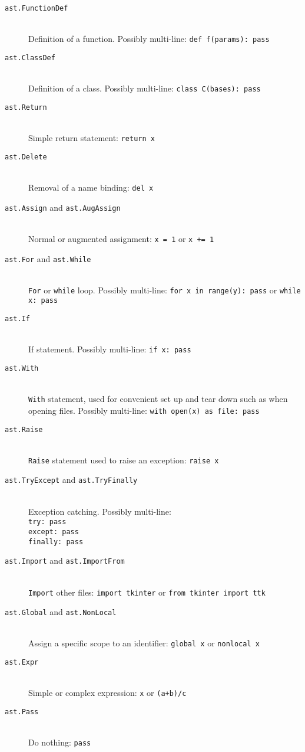 \documentclass[twoside,a4paper]{report}
\begin{document}
\begin{description}
\item[\texttt{ast.FunctionDef}] \hfill \\
Definition of a function. Possibly multi-line: \texttt{def f(params): pass}
\item[\texttt{ast.ClassDef}] \hfill \\
Definition of a class. Possibly multi-line: \texttt{class C(bases): pass}
\item[\texttt{ast.Return}] \hfill \\
Simple return statement: \texttt{return x}
\item[\texttt{ast.Delete}] \hfill \\
Removal of a name binding: \texttt{del x}
\item[\texttt{ast.Assign} and \texttt{ast.AugAssign}] \hfill \\
Normal or augmented assignment: \texttt{x = 1} or \texttt{x += 1}
\item[\texttt{ast.For} and \texttt{ast.While}] \hfill \\
\texttt{For} or \texttt{while} loop. Possibly multi-line: \texttt{for x in range(y): pass} or \texttt{while x: pass}
\item[\texttt{ast.If}] \hfill \\
If statement. Possibly multi-line: \texttt{if x: pass}
\item[\texttt{ast.With}] \hfill \\
\texttt{With} statement, used for convenient set up and tear down such as when opening files. Possibly multi-line: \texttt{with open(x) as file: pass}
\item[\texttt{ast.Raise}] \hfill \\
\texttt{Raise} statement used to raise an exception: \texttt{raise x}
\item[\texttt{ast.TryExcept} and \texttt{ast.TryFinally}] \hfill \\
Exception catching. Possibly multi-line: \\
\texttt{try: pass} \\
\texttt{except: pass} \\
\texttt{finally: pass}
\item[\texttt{ast.Import} and \texttt{ast.ImportFrom}] \hfill \\
\texttt{Import} other files: \texttt{import tkinter} or \texttt{from tkinter import ttk}
\item[\texttt{ast.Global} and \texttt{ast.NonLocal}] \hfill \\
Assign a specific scope to an identifier: \texttt{global x} or \texttt{nonlocal x}
\item[\texttt{ast.Expr}] \hfill \\
Simple or complex expression: \texttt{x} or \texttt{(a+b)/c}
\item[\texttt{ast.Pass}] \hfill \\
Do nothing: \texttt{pass}
\end{description}
\end{document}
